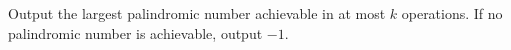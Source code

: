 Output the largest palindromic number achievable in at most $k$ operations. If no palindromic number is achievable, output $-1$.